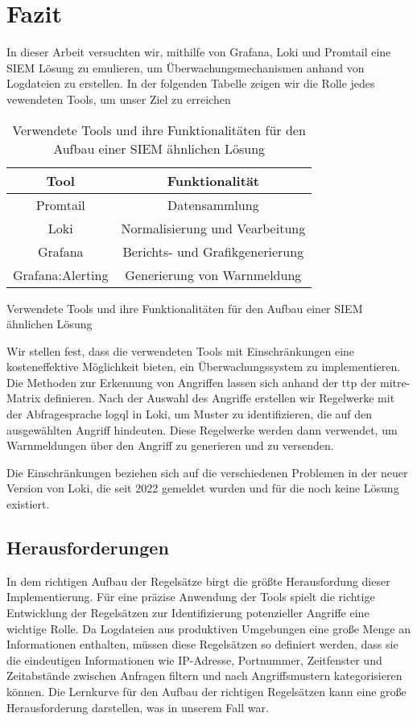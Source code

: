 \section{Fazit}

In dieser Arbeit versuchten wir, mithilfe von Grafana, Loki und Promtail eine \gls{SIEM} Lösung zu emulieren, um Überwachungsmechanismen anhand von Logdateien zu erstellen. In der folgenden Tabelle zeigen wir die Rolle jedes vewendeten Tools, um unser Ziel zu erreichen

\begin{table}[h]
    \centering
    \begin{tabular}{|c|c|}
    \hline
    \textbf{Tool}    & \textbf{Funktionalität}         \\ \hline
    Promtail         & Datensammlung                   \\ \hline
    Loki             & Normalisierung und Vearbeitung  \\ \hline
    Grafana          & Berichts- und Grafikgenerierung \\ \hline
    Grafana:Alerting & Generierung von Warnmeldung     \\ \hline
    \end{tabular}
    \caption{Verwendete Tools und ihre Funktionalitäten für den Aufbau einer \gls{SIEM} ähnlichen Lösung}
    {Verwendete Tools und ihre Funktionalitäten für den Aufbau einer \gls{SIEM} ähnlichen Lösung}
    \label{tab:VerewendeteTools}
\end{table}

Wir stellen fest, dass die verwendeten Tools mit Einschränkungen eine kosteneffektive Möglichkeit bieten, ein Überwachungssystem zu implementieren. Die Methoden zur Erkennung von Angriffen lassen sich anhand der \gls{ttp} der \gls{mitre}-Matrix definieren. Nach der Auswahl des Angriffe erstellen wir Regelwerke mit der Abfragesprache \gls{logql} in Loki, um Muster zu identifizieren, die auf den ausgewählten Angriff hindeuten. Diese Regelwerke werden dann verwendet, um Warnmeldungen über den Angriff zu generieren und zu versenden.

Die Einschränkungen beziehen sich auf die verschiedenen Problemen in der neuer Version von Loki, die seit 2022 gemeldet wurden und für die noch keine Lösung existiert.

\subsection{Herausforderungen}
In dem richtigen Aufbau der Regelsätze birgt die größte Herausfordung dieser Implementierung. Für eine präzise Anwendung der Tools spielt die richtige Entwicklung der Regelsätzen zur Identifizierung potenzieller Angriffe eine wichtige Rolle. Da Logdateien aus produktiven Umgebungen eine große Menge an Informationen enthalten, müssen diese Regelsätzen so definiert werden, dass sie die eindeutigen Informationen wie IP-Adresse, Portnummer, Zeitfenster und Zeitabstände zwischen Anfragen filtern und nach Angriffsmustern kategorisieren können. Die Lernkurve für den Aufbau der richtigen Regelsätzen kann eine große Herausforderung darstellen, was in unserem Fall war. 

